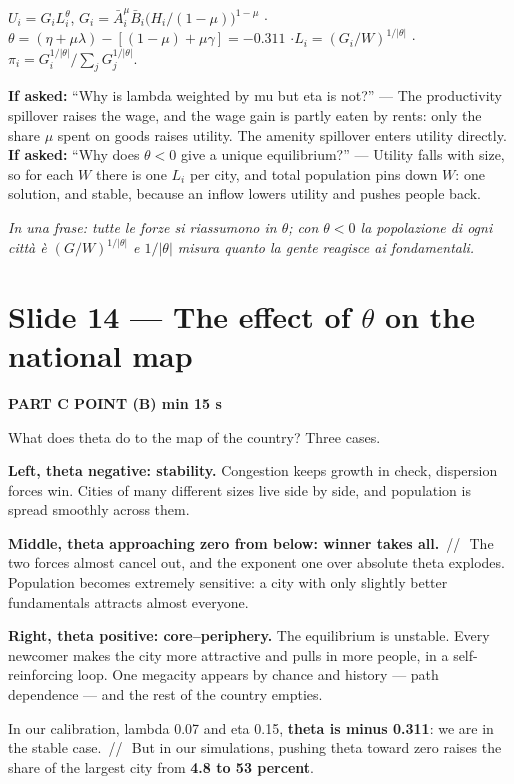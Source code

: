 \documentclass[11pt,a4paper]{article}
\newcommand{\slide}[3]{\Needspace{14\baselineskip}\section{#1}\textcolor{unicared}{\small\bfseries\MakeUppercase{#3}\quad\textperiodcentered\quad #2}\par}
\newcommand{\idea}[1]{\par{\small\itshape\color{unicablue}In una frase: #1}\par}
\newcommand{\pause}{\textcolor{unicared}{\,/\!/\,}}
\begin{document}
\begin{nums}
$U_i = G_iL_i^{\theta}$, $G_i = \bar A_i^{\mu}\bar B_i\big(H_i/(1-\mu)\big)^{1-\mu}$ \quad$\cdot$\quad $\theta = (\eta+\mu\lambda) - [(1-\mu)+\mu\gamma] = -0.311$ \quad$\cdot$\quad $L_i = (G_i/W)^{1/|\theta|}$ \quad$\cdot$\quad $\pi_i = G_i^{1/|\theta|}/\sum_j G_j^{1/|\theta|}$.
\end{nums}
\begin{ask}
\textbf{If asked:} ``Why is lambda weighted by mu but eta is not?'' --- The productivity spillover raises the wage, and the wage gain is partly eaten by rents: only the share $\mu$ spent on goods raises utility. The amenity spillover enters utility directly. \\
\textbf{If asked:} ``Why does $\theta<0$ give a unique equilibrium?'' --- Utility falls with size, so for each $W$ there is one $L_i$ per city, and total population pins down $W$: one solution, and stable, because an inflow lowers utility and pushes people back.
\end{ask}
\idea{tutte le forze si riassumono in $\theta$; con $\theta<0$ la popolazione di ogni città è $(G/W)^{1/|\theta|}$ e $1/|\theta|$ misura quanto la gente reagisce ai fondamentali.}

\slide{Slide 14 --- The effect of $\theta$ on the national map}{1 min 15 s}{Part C \textperiodcentered{} point (b)}

\begin{say}
What does theta do to the map of the country? Three cases.

\textbf{Left, theta negative: stability.} Congestion keeps growth in check, dispersion forces win. Cities of many different sizes live side by side, and population is spread smoothly across them.

\textbf{Middle, theta approaching zero from below: winner takes all.} \pause\ The two forces almost cancel out, and the exponent one over absolute theta explodes. Population becomes extremely sensitive: a city with only slightly better fundamentals attracts almost everyone.

\textbf{Right, theta positive: core--periphery.} The equilibrium is unstable. Every newcomer makes the city more attractive and pulls in more people, in a self-reinforcing loop. One megacity appears by chance and history --- path dependence --- and the rest of the country empties.

In our calibration, lambda 0.07 and eta 0.15, \textbf{theta is minus 0.311}: we are in the stable case. \pause\ But in our simulations, pushing theta toward zero raises the share of the largest city from \textbf{4.8 to 53 percent}.
\end{say}
\end{document}
